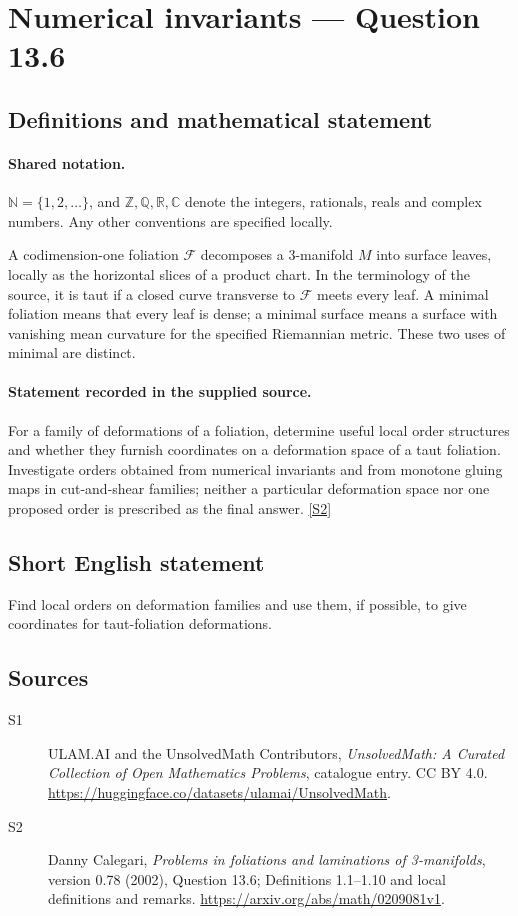 \documentclass[11pt]{article}
\newcommand{\sref}[2]{\hyperlink{source:#1:#2}{[S#2]}}
\begin{document}
\section{Numerical invariants — Question 13.6}\label{statement}

\subsection{Definitions and mathematical statement}

\paragraph{Shared notation.}$\mathbb N=\{1,2,\ldots\}$, and $\mathbb Z,\mathbb Q,\mathbb R,\mathbb C$ denote the integers, rationals, reals and complex numbers. Any other conventions are specified locally.


A codimension-one foliation $\mathcal F$ decomposes a $3$-manifold $M$ into surface leaves, locally as the horizontal slices of a product chart. In the terminology of the source, it is taut if a closed curve transverse to $\mathcal F$ meets every leaf. A minimal foliation means that every leaf is dense; a minimal surface means a surface with vanishing mean curvature for the specified Riemannian metric. These two uses of minimal are distinct.
\paragraph{Statement recorded in the supplied source.}
For a family of deformations of a foliation, determine useful local order structures and whether they furnish coordinates on a deformation space of a taut foliation. Investigate orders obtained from numerical invariants and from monotone gluing maps in cut-and-shear families; neither a particular deformation space nor one proposed order is prescribed as the final answer. \sref{statement}{2}
\subsection{Short English statement}
Find local orders on deformation families and use them, if possible, to give coordinates for taut-foliation deformations.
\subsection{Sources}
\begin{description}
\item[\hypertarget{source:statement:1}{S1}] ULAM.AI and the UnsolvedMath Contributors, \emph{UnsolvedMath: A Curated Collection of Open Mathematics Problems}, catalogue entry. CC BY 4.0. \url{https://huggingface.co/datasets/ulamai/UnsolvedMath}.
\item[\hypertarget{source:statement:2}{S2}] Danny Calegari, \emph{Problems in foliations and laminations of 3-manifolds}, version 0.78 (2002), Question 13.6; Definitions 1.1--1.10 and local definitions and remarks. \url{https://arxiv.org/abs/math/0209081v1}.
\end{description}
\label{end:statement}
\end{document}
